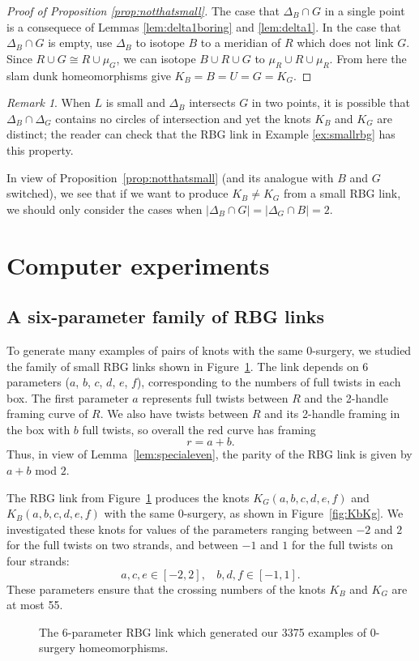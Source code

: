 \documentclass [11pt]{amsart}
\theoremstyle{remark}
\newtheorem {remark}[theorem]{Remark}
\begin{document}
\begin{proof}[Proof of Proposition \ref{prop:notthatsmall}]
The case that $\Delta_B\cap G$ in a single point is a consequece of Lemmas \ref{lem:delta1boring} and \ref{lem:delta1}. In the case that $\Delta_B\cap G$ is empty, use $\Delta_B$ to isotope $B$ to a meridian of $R$ which does not link $G$. Since $R\cup G\cong R\cup \mu_G$, we can isotope $B\cup R\cup G$ to $\mu_R\cup R\cup \mu_R$. From here the slam dunk homeomorphisms give $K_B=B=U=G=K_G$. 
\end{proof}

\begin{remark}
When $L$ is small and $\Delta_B$ intersects $G$ in two points, it is possible that $\Delta_B\cap\Delta_G$ contains no circles of intersection and yet the knots $K_B$ and $K_G$ are distinct; the reader can check that the RBG link in Example \ref{ex:smallrbg} has this property. 
\end{remark} 

In view of Proposition~\ref{prop:notthatsmall} (and its analogue with $B$ and $G$ switched), we see that if we want to produce $K_B \neq K_G$ from a small RBG link, we should only consider the cases when $|\Delta_B \cap G|=|\Delta_G \cap B|=2$.



\section{Computer experiments}
\label{sec:computer}
\subsection{A six-parameter family of RBG links}
To generate many examples of pairs of knots with the same $0$-surgery, we studied the family of small RBG links shown in Figure~\ref{fig:RBGforbigdata}. The link depends on $6$ parameters ($a$, $b$, $c$, $d$, $e$,  $f$), corresponding to the numbers of full twists in each box. The first parameter $a$ represents full twists between $R$ and the 2-handle framing curve of $R$. We also have twists between $R$ and its 2-handle framing in the box with $b$ full twists, so overall the red curve has framing $$r=a+b.$$ Thus, in view of Lemma~\ref{lem:specialeven}, the parity of the RBG link is given by $a+b$ mod $2$.


The RBG link from Figure~\ref{fig:RBGforbigdata} produces the knots $K_G(a, b, c, d, e, f)$ and $K_B(a, b, c, d, e, f)$ with the same $0$-surgery, as shown in Figure~\ref{fig:KbKg}. We investigated these knots for values of the parameters ranging between $-2$ and $2$ for the full twists on two strands, and between $-1$ and $1$ for the full twists on four strands:
$$ a, c, e \in [-2,2], \ \ \ \  b, d, f \in [-1, 1].$$
These parameters ensure that the crossing numbers of the knots $K_B$ and $K_G$ are at most 55. 
\begin{figure}
{
   \fontsize{9pt}{11pt}\selectfont 
   \def\svgwidth{2.4in}
   
}
\caption{The 6-parameter RBG link which generated our 3375 examples of 0-surgery homeomorphisms.}
\label{fig:RBGforbigdata}
\end{figure}
\end{document}
